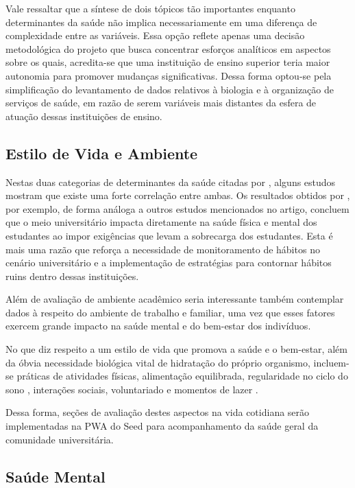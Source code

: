 Vale ressaltar que a síntese de dois tópicos tão importantes enquanto determinantes da saúde não implica necessariamente em uma diferença de complexidade entre as variáveis. Essa opção reflete apenas uma decisão metodológica do projeto que busca concentrar esforços analíticos em aspectos sobre os quais, acredita-se que uma instituição de ensino superior teria maior autonomia para promover mudanças significativas. Dessa forma optou-se pela simplificação do levantamento de dados relativos à biologia e à organização de serviços de saúde, em razão de serem variáveis mais distantes da esfera de atuação dessas instituições de ensino.

\subsection{Estilo de Vida e Ambiente}

Nestas duas categorias de determinantes da saúde citadas por , alguns estudos mostram que existe uma forte correlação entre ambas. Os resultados obtidos por , por exemplo, de forma análoga a outros estudos mencionados no artigo, concluem que o meio universitário impacta diretamente na saúde física e mental dos estudantes ao impor exigências que levam a sobrecarga dos estudantes. Esta é mais uma razão que reforça a necessidade de monitoramento de hábitos no cenário universitário e a implementação de estratégias para contornar hábitos ruins dentro dessas instituições.

Além de avaliação de ambiente acadêmico seria interessante também contemplar dados à respeito do ambiente de trabalho e familiar, uma vez que esses fatores exercem grande impacto na saúde mental e do bem-estar dos indivíduos.

No que diz respeito a um estilo de vida que promova a saúde e o bem-estar, além da óbvia necessidade biológica vital de hidratação do próprio organismo, incluem-se práticas de atividades físicas, alimentação equilibrada, regularidade no ciclo do sono \cite{arlinghaus2019importance}, interações sociais, voluntariado \cite{helliwell2025world} e momentos de lazer \cite{batista2012lazer}. 

Dessa forma, seções de avaliação destes aspectos na vida cotidiana serão implementadas na PWA do Seed para acompanhamento da saúde geral da comunidade universitária.

\subsection{Saúde Mental}

